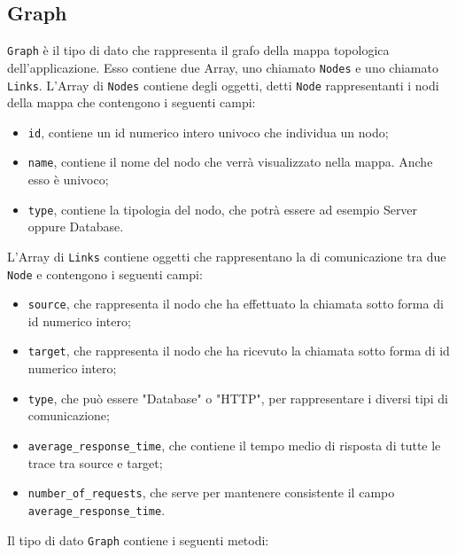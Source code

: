 \subsection{Graph}
\label{sec:Graph}
	\texttt{Graph} è il tipo di dato che rappresenta il grafo della mappa topologica dell'applicazione. Esso contiene due Array, uno chiamato \texttt{Nodes} e uno chiamato \texttt{Links}.
	\label{sec:Nodes}
	L'Array di \texttt{Nodes} contiene degli oggetti, detti \texttt{Node} rappresentanti i nodi della mappa che contengono i seguenti campi:
	\begin{itemize}
		\item \texttt{id}, contiene un id numerico intero univoco che individua un nodo;
		\item \texttt{name}, contiene il nome del nodo che verrà visualizzato nella mappa. Anche esso è univoco;
		\item \texttt{type}, contiene la tipologia del nodo, che potrà essere ad esempio Server oppure Database.
	\end{itemize}
	\label{sec:Links}
	L'Array di \texttt{Links} contiene oggetti che rappresentano la di comunicazione tra due \texttt{Node} e contengono i seguenti campi:
	\begin{itemize}
		\item{\texttt{source}, che rappresenta il nodo che ha effettuato la chiamata sotto forma di id numerico intero;}
		\item{\texttt{target}, che rappresenta il nodo che ha ricevuto la chiamata sotto forma di id numerico intero;}
		\item{\texttt{type}, che può essere "Database" o "HTTP", per rappresentare i diversi tipi di comunicazione;}
		\item{\texttt{average\_response\_time}, che contiene il tempo medio di risposta di tutte le trace tra source e target;}
		\item{\texttt{number\_of\_requests}, che serve per mantenere consistente il campo \texttt{average\_response\_time}.}
	\end{itemize}
	Il tipo di dato \texttt{Graph} contiene i seguenti metodi:

